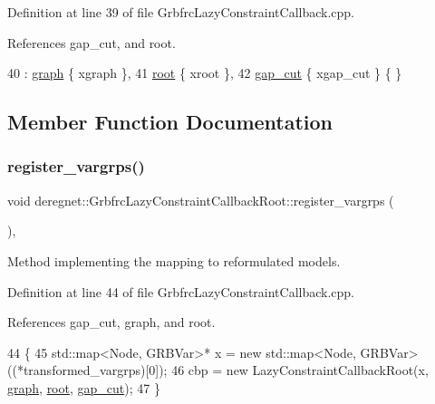 Definition at line 39 of file Grbfrc\+Lazy\+Constraint\+Callback.\+cpp.



References gap\+\_\+cut, and root.


\begin{DoxyCode}
40     : \hyperlink{classderegnet_1_1GrbfrcLazyConstraintCallbackRoot_a93e8aeef7796880ba2efa59770ed98ad}{graph} \{ xgraph \},
41       \hyperlink{classderegnet_1_1GrbfrcLazyConstraintCallbackRoot_a49a59d875ea23a1b443ec39b3c221e4d}{root} \{ xroot \},
42       \hyperlink{classderegnet_1_1GrbfrcLazyConstraintCallbackRoot_aa396c45cfdd6231f7c93560f5ce3f013}{gap\_cut} \{ xgap\_cut \} \{ \}
\end{DoxyCode}


\subsection{Member Function Documentation}
\mbox{\label{classderegnet_1_1GrbfrcLazyConstraintCallbackRoot_a257a89c84c5cf68ee764cc819f3a2653}} 
\subsubsection{\texorpdfstring{register\+\_\+vargrps()}{register\_vargrps()}}
{\footnotesize\ttfamily void deregnet\+::\+Grbfrc\+Lazy\+Constraint\+Callback\+Root\+::register\+\_\+vargrps (\begin{DoxyParamCaption}{ }\end{DoxyParamCaption})\hspace{0.3cm}{\ttfamily [override]}, {\ttfamily [virtual]}}



Method implementing the mapping to reformulated models. 



Definition at line 44 of file Grbfrc\+Lazy\+Constraint\+Callback.\+cpp.



References gap\+\_\+cut, graph, and root.


\begin{DoxyCode}
44                                                         \{
45     std::map<Node, GRBVar>* x = \textcolor{keyword}{new} std::map<Node, GRBVar>((*transformed\_vargrps)[0]);
46     cbp = \textcolor{keyword}{new} LazyConstraintCallbackRoot(x, \hyperlink{classderegnet_1_1GrbfrcLazyConstraintCallbackRoot_a93e8aeef7796880ba2efa59770ed98ad}{graph}, \hyperlink{classderegnet_1_1GrbfrcLazyConstraintCallbackRoot_a49a59d875ea23a1b443ec39b3c221e4d}{root}, \hyperlink{classderegnet_1_1GrbfrcLazyConstraintCallbackRoot_aa396c45cfdd6231f7c93560f5ce3f013}{gap\_cut});
47 \}
\end{DoxyCode}


